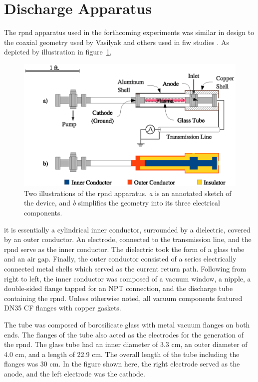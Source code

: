 \section{Discharge Apparatus}

The \acs{rpnd} apparatus used in the forthcoming experiments was similar in
design to the coaxial geometry used by Vasilyak and others used in \acs{fiw}
studies \cite{Vasilyak1994}. As depicted by illustration in
figure~\ref{fig:appschem},
\begin{figure}
  \centering
  \includegraphics{./chapters/experiment/figures/appschem.eps}
  \caption{Two illustrations of the \acs{rpnd} apparatus. \emph{a} is
    an annotated sketch of the device, and \emph{b} simplifies the geometry
    into its three electrical components.}
  \label{fig:appschem}
\end{figure}
it is essentially a cylindrical inner conductor, surrounded by a dielectric,
covered by an outer conductor. An electrode, connected to the transmission line,
and the \acs{rpnd} serve as the inner conductor. The dielectric took the form of
a glass tube and an air gap. Finally, the outer conductor consisted of a series
electrically connected metal shells which served as the current return path.
Following from right to left, the inner conductor was composed of a vacuum
window, a nipple, a double-sided flange tapped for an NPT connection, and the
discharge tube containing the \acs{rpnd}. Unless otherwise noted, all vacuum
components featured DN35 CF flanges with copper gaskets.

The tube was composed of borosilicate glass with metal vacuum flanges on both
ends. The flanges of the tube also acted as the electrodes for the generation of
the \acs{rpnd}. The glass tube had an inner diameter of 3.3 cm, an outer
diameter of 4.0 cm, and a length of 22.9 cm. The overall length of the tube
including the flanges was 30 cm. In the figure shown here, the right electrode
served as the anode, and the left electrode was the cathode.

